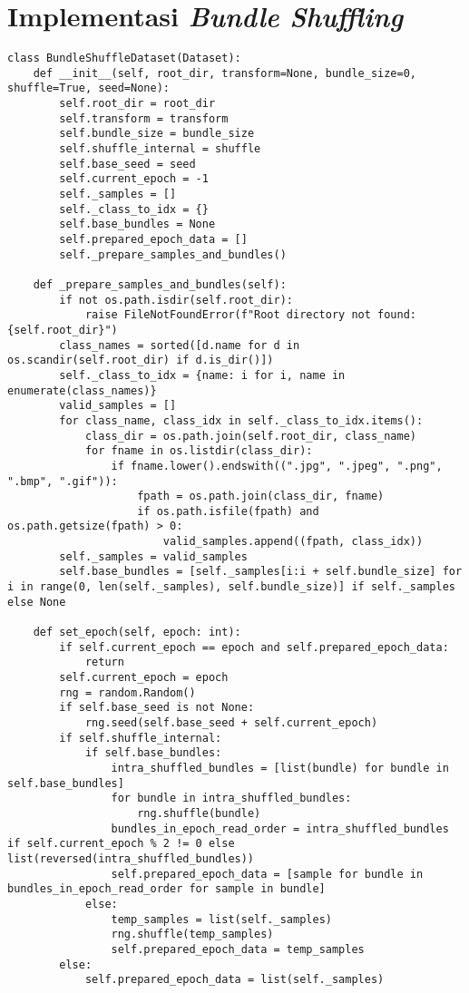\section{Implementasi \textit{Bundle Shuffling}}
\vspace{1.5pt}
\begin{lstlisting}
class BundleShuffleDataset(Dataset):
    def __init__(self, root_dir, transform=None, bundle_size=0, shuffle=True, seed=None):
        self.root_dir = root_dir
        self.transform = transform
        self.bundle_size = bundle_size
        self.shuffle_internal = shuffle
        self.base_seed = seed
        self.current_epoch = -1
        self._samples = []
        self._class_to_idx = {}
        self.base_bundles = None
        self.prepared_epoch_data = []
        self._prepare_samples_and_bundles()

    def _prepare_samples_and_bundles(self):
        if not os.path.isdir(self.root_dir):
            raise FileNotFoundError(f"Root directory not found: {self.root_dir}")
        class_names = sorted([d.name for d in os.scandir(self.root_dir) if d.is_dir()])
        self._class_to_idx = {name: i for i, name in enumerate(class_names)}
        valid_samples = []
        for class_name, class_idx in self._class_to_idx.items():
            class_dir = os.path.join(self.root_dir, class_name)
            for fname in os.listdir(class_dir):
                if fname.lower().endswith((".jpg", ".jpeg", ".png", ".bmp", ".gif")):
                    fpath = os.path.join(class_dir, fname)
                    if os.path.isfile(fpath) and os.path.getsize(fpath) > 0:
                        valid_samples.append((fpath, class_idx))
        self._samples = valid_samples
        self.base_bundles = [self._samples[i:i + self.bundle_size] for i in range(0, len(self._samples), self.bundle_size)] if self._samples else None

    def set_epoch(self, epoch: int):
        if self.current_epoch == epoch and self.prepared_epoch_data:
            return
        self.current_epoch = epoch
        rng = random.Random()
        if self.base_seed is not None:
            rng.seed(self.base_seed + self.current_epoch)
        if self.shuffle_internal:
            if self.base_bundles:
                intra_shuffled_bundles = [list(bundle) for bundle in self.base_bundles]
                for bundle in intra_shuffled_bundles:
                    rng.shuffle(bundle)
                bundles_in_epoch_read_order = intra_shuffled_bundles if self.current_epoch % 2 != 0 else list(reversed(intra_shuffled_bundles))
                self.prepared_epoch_data = [sample for bundle in bundles_in_epoch_read_order for sample in bundle]
            else:
                temp_samples = list(self._samples)
                rng.shuffle(temp_samples)
                self.prepared_epoch_data = temp_samples
        else:
            self.prepared_epoch_data = list(self._samples)


\end{lstlisting}
